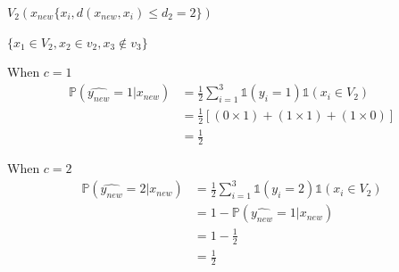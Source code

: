 \documentclass[12pt,a4paper]{article}
\begin{document}
\begin{enumerate}
\begin{enumerate}
$V_2(x_{new}  \{ x_i, d(x_{new},x_i ) \leq d_2  = 2  \})   $

$ \{ x_1 \in V_2 , x_2 \in v_2 ,  x_3 \not \in v_3  \}$

When $c = 1$
\begin{align*}
		\mathbb{P}(\widehat{y_{new}}  = 1 | x_{new}) &= \frac{1}{2} \sum_{i = 1}^3  \mathbb{1}(y_i  = 1)   \mathbb{1}(x_i \in V_2)  \\
		&= \frac{1}{2} [ (0 \times 1) +  (1 \times 1)  + (1  \times 0) ]   \\
		&=  \frac{1}{2}
\end{align*}

When $c = 2$
\begin{align*}
		\mathbb{P}(\widehat{y_{new}}  = 2| x_{new}) &= \frac{1}{2} \sum_{i = 1}^3  \mathbb{1}(y_i  = 2)   \mathbb{1}(x_i \in V_2)  \\
		&= 1-  	\mathbb{P}(\widehat{y_{new}}  = 1| x_{new})    \\
		&=  1 -   \frac{1}{2} \\
		&=  \frac{1}{2}
\end{align*}


\end{enumerate}
\end{enumerate}
\end{document}
